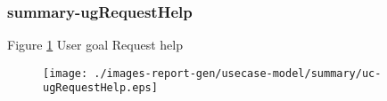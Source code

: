 \subsubsection{summary-ugRequestHelp}

\label{RE-use-case-ugRequestHelp}



Figure \ref{fig:lu.uni.lassy.excalibur.g01.specification-RE-UCD-uc-ugRequestHelp}
User goal Request help

\begin{figure}[htbp]
\begin{center}

\texttt{[image: ./images-report-gen/usecase-model/summary/uc-ugRequestHelp.eps]}
\end{center}
\caption[lu.uni.lassy.excalibur.g01.specification Use Case Diagram: uc-ugRequestHelp]{}
\label{fig:lu.uni.lassy.excalibur.g01.specification-RE-UCD-uc-ugRequestHelp}
\end{figure}
\vspace{0.5cm}
